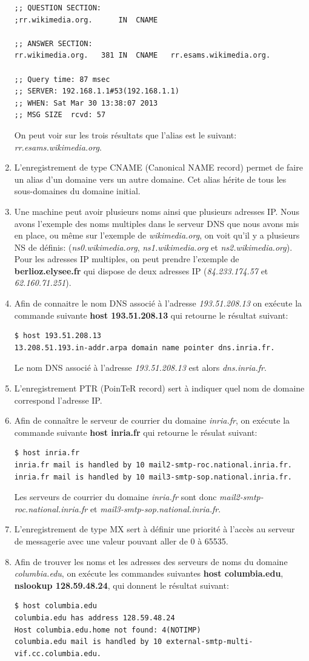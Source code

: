 \documentclass[a4paper,10pt]{article}
\begin{document}
\begin{enumerate}
\begin{verbatim}
;; QUESTION SECTION:
;rr.wikimedia.org.		IN	CNAME

;; ANSWER SECTION:
rr.wikimedia.org.	381	IN	CNAME	rr.esams.wikimedia.org.

;; Query time: 87 msec
;; SERVER: 192.168.1.1#53(192.168.1.1)
;; WHEN: Sat Mar 30 13:38:07 2013
;; MSG SIZE  rcvd: 57
\end{verbatim}
On peut voir sur les trois résultats que l'alias est le suivant: \textit{rr.esams.wikimedia.org}.
\item L'enregistrement de type CNAME (Canonical NAME record) permet de faire un alias d'un domaine vers un autre domaine. Cet alias hérite de tous les sous-domaines du domaine initial.
\item Une machine peut avoir plusieurs noms ainsi que plusieurs adresses IP. Nous avons l'exemple des noms multiples dans le serveur DNS que nous avons mis en place, ou même sur l'exemple de \textit{wikimedia.org}, on voit qu'il y a plusieurs NS de définis: (\textit{ns0.wikimedia.org}, \textit{ns1.wikimedia.org} et \textit{ns2.wikimedia.org}). Pour les adresses IP multiples, on peut prendre l'exemple de \textbf{berlioz.elysee.fr} qui dispose de deux adresses IP (\textit{84.233.174.57} et \textit{62.160.71.251}).
\item Afin de connaitre le nom DNS associé à l'adresse \textit{193.51.208.13} on exécute la commande suivante \textbf{host 193.51.208.13} qui retourne le résultat suivant:
\begin{verbatim}
$ host 193.51.208.13
13.208.51.193.in-addr.arpa domain name pointer dns.inria.fr.
\end{verbatim}
Le nom DNS associé à l'adresse \textit{193.51.208.13} est alors \textit{dns.inria.fr}.
\item L'enregistrement PTR (PoinTeR record) sert à indiquer quel nom de domaine correspond l'adresse IP.
\item Afin de connaître le serveur de courrier du domaine \textit{inria.fr}, on exécute la commande suivante \textbf{host inria.fr} qui retourne le résulat suivant:
\begin{verbatim}
$ host inria.fr
inria.fr mail is handled by 10 mail2-smtp-roc.national.inria.fr.
inria.fr mail is handled by 10 mail3-smtp-sop.national.inria.fr.
\end{verbatim}
Les serveurs de courrier du domaine \textit{inria.fr} sont donc \textit{mail2-smtp-roc.national.inria.fr} et \textit{mail3-smtp-sop.national.inria.fr}.
\item L'enregistrement de type MX sert à définir une priorité à l'accès au serveur de messagerie avec une valeur pouvant aller de 0 à 65535.
\item Afin de trouver les noms et les adresses des serveurs de noms du domaine \textit{columbia.edu}, on exécute les commandes suivantes \textbf{host columbia.edu}, \textbf{nslookup 128.59.48.24}, qui donnent le résultat suivant:
\begin{verbatim}
$ host columbia.edu
columbia.edu has address 128.59.48.24
Host columbia.edu.home not found: 4(NOTIMP)
columbia.edu mail is handled by 10 external-smtp-multi-vif.cc.columbia.edu.


\end{verbatim}
\end{enumerate}
\end{document}
